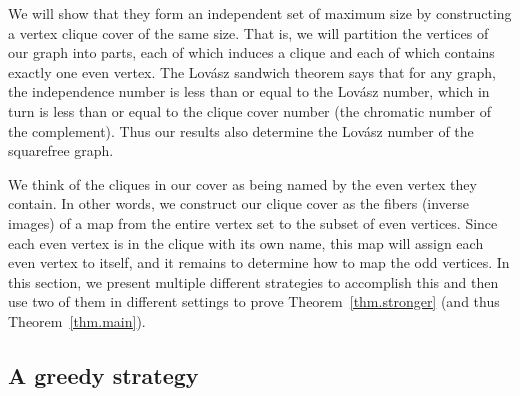 \documentclass{article}
\theoremstyle{plain}
\theoremstyle{definition}
\theoremstyle{remark}
\newcommand{\Lovasz}{Lov\'asz}
\begin{document}
We will show that they form an independent set of maximum size by constructing a vertex clique cover of the same size.
That is, we will partition the vertices of our graph into parts, each of which induces a clique and each of which contains exactly one even vertex.
The \Lovasz{} sandwich theorem says that for any graph, the independence number is less than or equal to the \Lovasz{} number, which in turn is less than or equal to the clique cover number (the chromatic number of the complement).
Thus our results also determine the \Lovasz{} number of the squarefree graph.

We think of the cliques in our cover as being named by the even vertex they contain.
In other words, we construct our clique cover as the fibers (inverse images) of a map from the entire vertex set to the subset of even vertices.
Since each even vertex is in the clique with its own name, this map will assign each even vertex to itself, and it remains to determine how to map the odd vertices.
In this section, we present multiple different strategies to accomplish this and then use two of them in different settings to prove Theorem~\ref{thm.stronger} (and thus Theorem~\ref{thm.main}).

\subsection{A greedy strategy}
\end{document}
